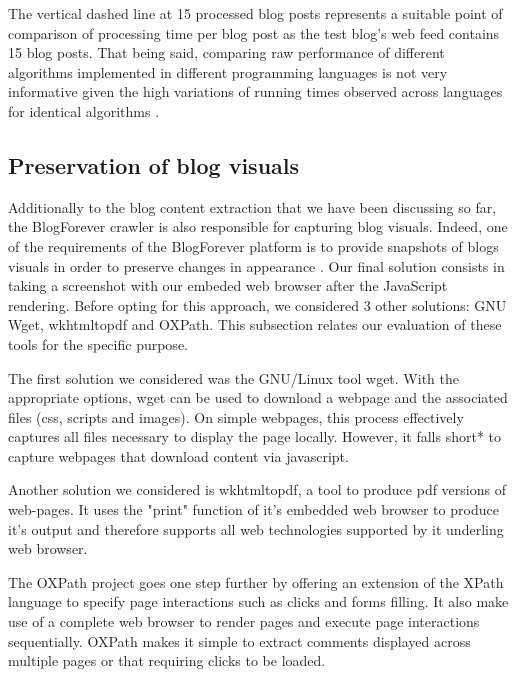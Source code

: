 The vertical dashed line at 15 processed blog posts represents a suitable point of comparison of processing time per blog post as the test blog's web feed contains 15 blog posts. That being said, comparing raw performance of different algorithms implemented in different programming languages is not very informative given the high variations of running times observed across languages for identical algorithms \cite{hundt2011}.



\subsection{Preservation of blog visuals}

Additionally to the blog content extraction that we have been discussing so far, the BlogForever crawler is also responsible for capturing blog visuals. Indeed, one of the requirements of the BlogForever platform is to provide snapshots of blogs visuals in order to preserve changes in appearance \cite[FR53]{blogforeverrequirements2009}. Our final solution consists in taking a screenshot with our embeded web browser after the JavaScript rendering. Before opting for this approach, we considered 3 other solutions: GNU Wget, wkhtmltopdf and OXPath. This subsection relates our evaluation of these tools for the specific purpose.

The first solution we considered was the GNU/Linux tool wget. With the appropriate options, wget can be used to download a webpage and the associated files (css, scripts and images). On simple webpages, this process effectively captures all files necessary to display the page locally. However, it falls short* to capture webpages that download content via javascript.

Another solution we considered is wkhtmltopdf, a tool to produce pdf versions of web-pages. It uses the "print" function of it's embedded web browser to produce it's output and therefore supports all web technologies supported by it underling web browser.

The OXPath project goes one step further by offering an extension of the XPath language to specify page interactions such as clicks and forms filling. It also make use of a complete web browser to render pages and execute page interactions sequentially. OXPath makes it simple to extract comments displayed across multiple pages or that requiring clicks to be loaded.


